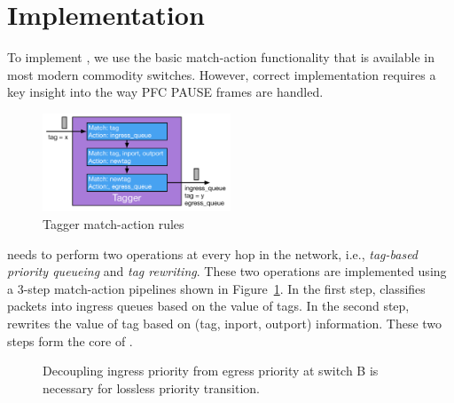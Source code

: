 \section{Implementation}\label{sec:implementation}

To implement \sysname{}, we use the basic match-action functionality that is
available in most modern commodity switches. However, correct implementation
requires a key insight into the way PFC PAUSE frames are handled.

\begin{figure}
	\hspace{-0.2in}
	\centering
	\includegraphics[width=0.5\textwidth] {figs/Tagger}
	\caption{Tagger match-action rules}\label{fig:tagger}
	
\end{figure}

 \sysname{} needs to perform two operations at every
hop in the network, i.e., {\em tag-based priority queueing} and {\em tag
rewriting}.  These two operations are implemented using a 3-step match-action
pipelines shown in Figure~\ref{fig:tagger}.  In the first step, \sysname{}
classifies packets into ingress queues based on the value of tags. In the second
step, \sysname{} rewrites the value of tag based on (tag, inport, outport)
information. These two steps form the core of \sysname{}.

\begin{figure}[t]
 	\centering

 	\caption{Decoupling ingress priority from egress priority at switch B is necessary for lossless priority transition.}\label{fig:prioritydecoupling}
	\vspace{-1em}
\end{figure}


